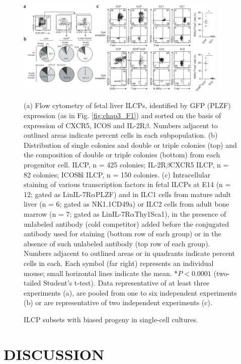 \begin{figure}[p]
\begin{center}
	\includegraphics[width=0.9\textwidth]{figures/chapter3/F7}
\end{center}
	\caption{ILCP subsets with biased progeny in single-cell cultures.} 
	(a) Flow cytometry of fetal liver ILCPs, identified by GFP (PLZF) expression (as in Fig. \ref{fig:chap3_F1}) and sorted on the basis of expression of CXCR5, ICOS and IL-2R$\beta$. Numbers adjacent to outlined areas indicate percent cells in each subpopulation. (b) Distribution of single colonies and double or triple colonies (top) and the composition of double or triple colonies (bottom) from each progenitor cell. ILCP, n = 425 colonies; IL-2R$\beta$\UP CXCR5\UM{} ILCP, n = 82 colonies; ICOS\U{hi} ILCP, n = 150 colonies. (c) Intracellular staining of various transcription factors in fetal ILCPs at E14 (n = 12; gated as Lin\UM IL-7R$\alpha$\UP \ab\UP PLZF\UP) and in ILC1 cells from mature adult liver (n = 6; gated as \CDte\UM NK1.1\UP CD49a\UP) or ILC2 cells from adult bone marrow (n = 7; gated as Lin\UM IL-7R$\alpha$\UP Thy1\UP Sca1\UP), in the presence of unlabeled antibody (cold competitor) added before the conjugated antibody used for staining (bottom row of each group) or in the absence of such unlabeled antibody (top row of each group). Numbers adjacent to outlined areas or in quadrants indicate percent cells in each. Each symbol (far right) represents an individual mouse; small horizontal lines indicate the mean. *$P < 0.0001$ (two-tailed Student's t-test). Data representative of at least three experiments (a), are pooled from one to six independent experiments (b) or are representative of two independent experiments (c).
	\label{fig:chap3_F7}
\end{figure}

\section{DISCUSSION}

